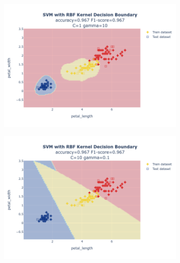\documentclass{article}
\begin{document}
\begin{figure}
\begin{subfigure}{0.3\textwidth}
        \includegraphics[scale=.13]{images/implementation/q1/rbf_kernel/petal_length_petal_width_1_10.png}
    \end{subfigure}
    \newline
    \begin{subfigure}{0.3\textwidth}
        \centering
        \includegraphics[scale=.13]{images/implementation/q1/rbf_kernel/petal_length_petal_width_10_0.1.png}
    \end{subfigure}
    \hfill
    \begin{subfigure}{0.3\textwidth}
        \centering

\end{subfigure}
\end{figure}
\end{document}
